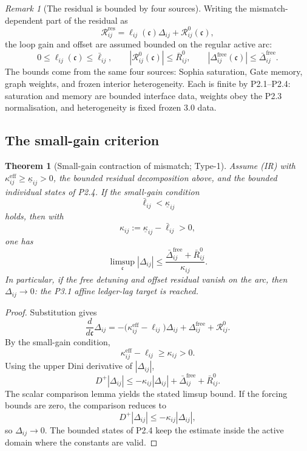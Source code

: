 \documentclass[11pt,a4paper]{article}
\theoremstyle{definition}
\theoremstyle{plain}
\newtheorem{theorem}[definition]{Theorem}
\theoremstyle{remark}
\newtheorem{remark}[definition]{Remark}
\begin{document}
\begin{remark}[The residual is bounded by four sources]\label{rem:residual}
Writing the mismatch-dependent part of the residual as
\[
\mathcal R^{\mathrm{res}}_{ij}
=
\ell_{ij}(\mathfrak c)\Delta_{ij}
+
\mathcal R^{0}_{ij}(\mathfrak c),
\]
the loop gain and offset are assumed bounded on the regular active arc:
\[
0\le \ell_{ij}(\mathfrak c)\le \bar\ell_{ij},
\qquad
|\mathcal R^0_{ij}(\mathfrak c)|\le \bar R^0_{ij},
\qquad
|\Delta^{\mathrm{free}}_{ij}(\mathfrak c)|\le \bar\Delta^{\mathrm{free}}_{ij}.
\]
The bounds come from the same four sources: Sophia saturation, Gate memory,
graph weights, and frozen interior heterogeneity. Each is finite by P2.1--P2.4:
saturation and memory are bounded interface data, weights obey the P2.3
normalisation, and heterogeneity is fixed frozen 3.0 data.
\end{remark}

\subsection{The small-gain criterion}

\begin{theorem}[Small-gain contraction of mismatch; Type-1]\label{thm:smallgain}
Assume \textup{(IR)} with \(\kappa^{\mathrm{eff}}_{ij}\ge\underline\kappa_{ij}>0\),
the bounded residual decomposition above, and the bounded individual states of
P2.4. If the small-gain condition
\[
\boxed{\;
\bar\ell_{ij}<\underline\kappa_{ij}
\;}
\]
holds, then with
\[
\kappa_{ij}:=\underline\kappa_{ij}-\bar\ell_{ij}>0,
\]
one has
\[
\limsup_{\mathfrak c}|\Delta_{ij}|
\le
\frac{\bar\Delta^{\mathrm{free}}_{ij}+\bar R^0_{ij}}{\kappa_{ij}}.
\]
In particular, if the free detuning and offset residual vanish on the arc, then
\(\Delta_{ij}\to0\): the P3.1 affine ledger-lag target is reached.
\end{theorem}

\begin{proof}
Substitution gives
\[
\frac{d}{d\mathfrak c}\Delta_{ij}
=
-\bigl(\kappa^{\mathrm{eff}}_{ij}-\ell_{ij}\bigr)\Delta_{ij}
+\Delta^{\mathrm{free}}_{ij}
+\mathcal R^0_{ij}.
\]
By the small-gain condition,
\[
\kappa^{\mathrm{eff}}_{ij}-\ell_{ij}\ge\kappa_{ij}>0.
\]
Using the upper Dini derivative of \(|\Delta_{ij}|\),
\[
D^+|\Delta_{ij}|
\le
-\kappa_{ij}|\Delta_{ij}|
+\bar\Delta^{\mathrm{free}}_{ij}
+\bar R^0_{ij}.
\]
The scalar comparison lemma yields the stated limsup bound. If the forcing bounds
are zero, the comparison reduces to
\[
D^+|\Delta_{ij}|\le-\kappa_{ij}|\Delta_{ij}|,
\]
so \(\Delta_{ij}\to0\). The bounded states of P2.4 keep the estimate inside the
active domain where the constants are valid. \qedhere
\end{proof}
\end{document}
